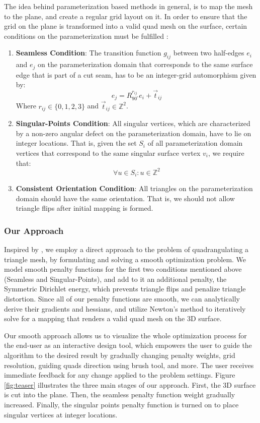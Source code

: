 \noindent The idea behind parameterization based methods in general, is to map the mesh to the plane, and create a regular grid layout on it. In order to ensure that the grid on the plane is transformed into a valid quad mesh on the surface, certain conditions on the parameterization must be fulfilled \cite{bommes:hal-00862648}:

\begin{enumerate}
  \item \textbf{Seamless Condition}: The transition function $g_{ij}$ between two half-edges $e_i$ and $e_j$ on the parameterization domain that corresponds to the same surface edge that is part of a cut seam, has to be an integer-grid automorphism given by:
  $$e_j = R^{r_{ij}}_{90^\circ}e_i + \vec{t}_{ij}$$
  Where  $r_{ij} \in \{0,1,2,3\}$ and $\vec{t}_{ij} \in \mathbb{Z}^2$.
  
  \item \textbf{Singular-Points Condition}: All singular vertices, which are characterized by a non-zero angular defect on the parameterization domain, have to lie on integer locations. That is, given the set $S_i$ of all parameterization domain vertices that correspond to the same singular surface vertex $v_i$, we require that:
  $$\forall u \in S_i: u \in \mathbb{Z}^2 $$
  
  \item \textbf{Consistent Orientation Condition}: All triangles on the parameterization domain should have the same orientation. That is, we should not allow triangle flips after initial mapping is formed.
\end{enumerate}

\subsubsection{Our Approach}
Inspired by \cite{Poranne:Autocuts:2017}, we employ a direct approach to the problem of quadrangulating a triangle mesh, by formulating and solving a smooth optimization problem. We model smooth penalty functions for the first two conditions mentioned above (Seamless and Singular-Points), and add to it an additional penalty, the Symmetric Dirichlet energy, which prevents triangle flips and penalize triangle distortion.
Since all of our penalty functions are smooth, we can analytically derive their gradients and hessians, and utilize Newton's method to iteratively solve for a mapping that renders a valid quad mesh on the 3D surface.

\noindent Our smooth approach allows us to visualize the whole optimization process for the end-user as an interactive design tool, which empowers the user to guide the algorithm to the desired result by gradually changing penalty weights, grid resolution, guiding quads direction using brush tool, and more. The user receives immediate feedback for any change applied to the problem settings. Figure \ref{fig:teaser} illustrates the three main stages of our approach. First, the 3D surface is cut into the plane. Then, the seamless penalty function weight gradually increased. Finally, the singular points penalty function is turned on to place singular vertices at integer locations.

